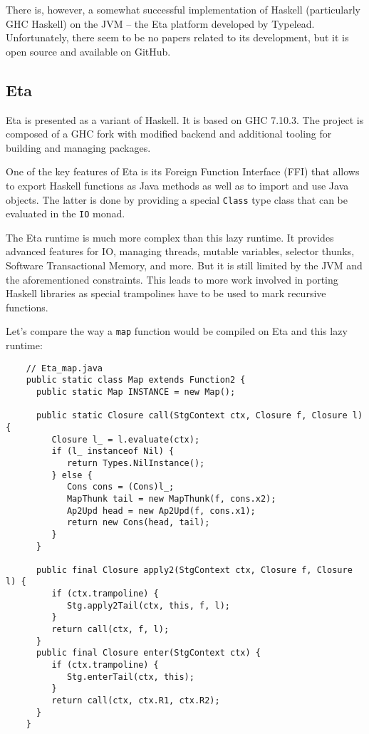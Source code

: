 \documentclass[en]{pracamgr}
\begin{document}
There is, however, a somewhat successful implementation of
Haskell (particularly GHC Haskell) on the JVM -- the Eta
platform developed by Typelead. Unfortunately, there seem
to be no papers related to its development, but it is
open source and available on GitHub.

\subsection{Eta}

Eta is presented as a variant of Haskell. It is based on
GHC 7.10.3. The project is composed of a GHC fork with
modified backend and additional tooling for building
and managing packages.

One of the key features of Eta is its Foreign Function Interface (FFI)
that allows to export Haskell functions as Java methods
as well as to import and use Java objects.
The latter is done by providing a special \texttt{Class} type class
that can be evaluated in the \texttt{IO} monad.

The Eta runtime is much more complex than this lazy runtime.
It provides advanced features for IO, managing threads, mutable variables,
selector thunks, Software Transactional Memory, and more.
But it is still limited by the JVM and the aforementioned
constraints. This leads to more work involved in porting
Haskell libraries as special trampolines have to be used
to mark recursive functions.

Let's compare the way a \texttt{map} function would be compiled
on Eta and this lazy runtime:

\begin{verbatim}
    // Eta_map.java
    public static class Map extends Function2 {
      public static Map INSTANCE = new Map();

      public static Closure call(StgContext ctx, Closure f, Closure l) {
         Closure l_ = l.evaluate(ctx);
         if (l_ instanceof Nil) {
            return Types.NilInstance();
         } else {
            Cons cons = (Cons)l_;
            MapThunk tail = new MapThunk(f, cons.x2);
            Ap2Upd head = new Ap2Upd(f, cons.x1);
            return new Cons(head, tail);
         }
      }

      public final Closure apply2(StgContext ctx, Closure f, Closure l) {
         if (ctx.trampoline) {
            Stg.apply2Tail(ctx, this, f, l);
         }
         return call(ctx, f, l);
      }
      public final Closure enter(StgContext ctx) {
         if (ctx.trampoline) {
            Stg.enterTail(ctx, this);
         }
         return call(ctx, ctx.R1, ctx.R2);
      }
    }
\end{verbatim}
\end{document}
